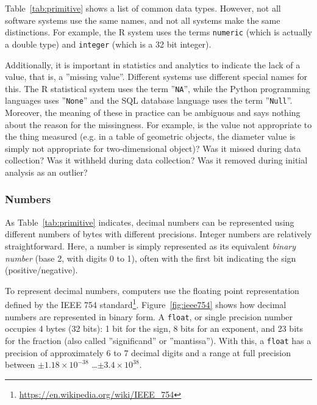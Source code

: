 Table~\ref{tab:primitive} shows a list of common data types. However, not all software systems use the same names, and not all systems make the same distinctions. For example, the R system uses the terms \texttt{numeric} (which is actually a double type) and \texttt{integer} (which is a 32 bit integer).

Additionally, it is important in statistics and analytics to indicate the lack of a value, that is, a ''missing value''. Different systems use different special names for this. The R statistical system uses the term ''\texttt{NA}'', while the Python programming languages uses ''\texttt{None}'' and the SQL database language uses the term ''\texttt{Null}''. Moreover, the meaning of these in practice can be ambiguous and says nothing about the reason for the missingness. For example, is the value not appropriate to the thing measured (e.g. in a table of geometric objects, the diameter value is simply not appropriate for two-dimensional object)? Was it missed during data collection? Was it withheld during data collection? Was it removed during initial analysis as an outlier?

\subsubsection*{Numbers} 

As Table~\ref{tab:primitive} indicates, decimal numbers can be represented using different numbers of bytes with different precisions. Integer numbers are relatively straightforward. Here, a number is simply represented as its equivalent \emph{binary number} (base 2, with digits 0 to 1), often with the first bit indicating the sign (positive/negative).

To represent decimal numbers, computers use the floating point representation defined by the IEEE 754 standard\footnote{\url{https://en.wikipedia.org/wiki/IEEE_754}}. Figure~\ref{fig:ieee754} shows how decimal numbers are represented in binary form. A \texttt{float}, or single precision number occupies 4 bytes (32 bits): 1 bit for the sign, 8 bits for an exponent, and 23 bits for the fraction (also called ''significand'' or ''mantissa''). With this, a \texttt{float} has a precision of approximately 6 to 7 decimal digits and a range at full precision between $\pm 1.18 \times 10^{-38}$ \ldots $\pm 3.4 \times 10^{38}$. 

